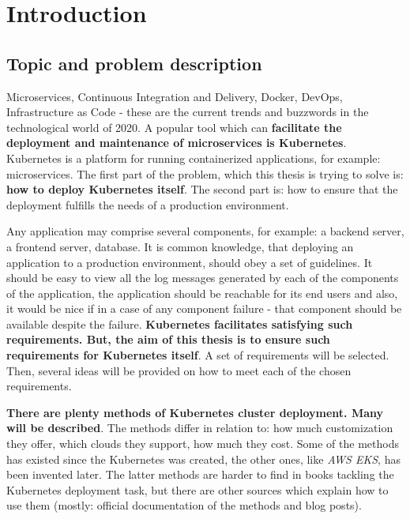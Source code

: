 \section{Introduction}


\subsection{Topic and problem description}

Microservices, Continuous Integration and Delivery, Docker, DevOps, Infrastructure as Code - these are the current trends and buzzwords in the technological world of 2020. A popular tool which can \textbf{facilitate the deployment and maintenance of microservices is Kubernetes}. Kubernetes is a platform for running containerized applications, for example: microservices. The first part of the problem, which this thesis is trying to solve is: \textbf{how to deploy Kubernetes itself}. The second part is: how to ensure that the deployment fulfills the needs of a production environment.

Any application may comprise several components, for example: a backend server, a frontend server, database. It is common knowledge, that deploying an application to a production environment, should obey a set of guidelines. It should be easy to view all the log messages generated by each of the components of the application, the application should be reachable for its end users and also, it would be nice if in a case of any component failure - that component should be available despite the failure. \textbf{Kubernetes facilitates satisfying such requirements. But, the aim of this thesis is to ensure such requirements for Kubernetes itself}. A set of requirements will be selected. Then, several ideas will be provided on how to meet each of the chosen requirements.

\textbf{There are plenty methods of Kubernetes cluster deployment. Many will be described}. The methods differ in relation to: how much customization they offer, which clouds they support, how much they cost. Some of the methods has existed since the Kubernetes was created, the other ones, like \textit{AWS EKS}, has been invented later. The latter methods are harder to find in books tackling the Kubernetes deployment task, but there are other sources which explain how to use them (mostly: official documentation of the methods and blog posts).

